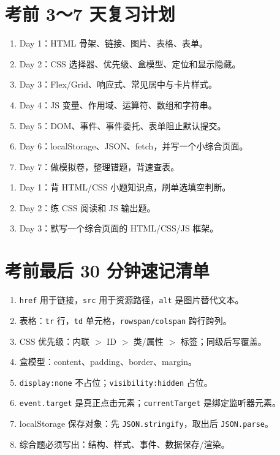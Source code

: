 \documentclass[UTF8,zihao=-4]{ctexart}
\begin{document}
\section{考前 3～7 天复习计划}
\begin{methodbox}[7 天版]
\begin{enumerate}
  \item Day 1：HTML 骨架、链接、图片、表格、表单。
  \item Day 2：CSS 选择器、优先级、盒模型、定位和显示隐藏。
  \item Day 3：Flex/Grid、响应式、常见居中与卡片样式。
  \item Day 4：JS 变量、作用域、运算符、数组和字符串。
  \item Day 5：DOM、事件、事件委托、表单阻止默认提交。
  \item Day 6：localStorage、JSON、fetch，并写一个小综合页面。
  \item Day 7：做模拟卷，整理错题，背速查表。
\end{enumerate}
\end{methodbox}

\begin{methodbox}[3 天版]
\begin{enumerate}
  \item Day 1：背 HTML/CSS 小题知识点，刷单选填空判断。
  \item Day 2：练 CSS 阅读和 JS 输出题。
  \item Day 3：默写一个综合页面的 HTML/CSS/JS 框架。
\end{enumerate}
\end{methodbox}

\section{考前最后 30 分钟速记清单}
\begin{keybox}[只看这些]
\begin{enumerate}
  \item \texttt{href} 用于链接，\texttt{src} 用于资源路径，\texttt{alt} 是图片替代文本。
  \item 表格：\texttt{tr} 行，\texttt{td} 单元格，\texttt{rowspan/colspan} 跨行跨列。
  \item CSS 优先级：内联 $>$ ID $>$ 类/属性 $>$ 标签；同级后写覆盖。
  \item 盒模型：content、padding、border、margin。
  \item \texttt{display:none} 不占位；\texttt{visibility:hidden} 占位。
  \item \texttt{event.target} 是真正点击元素；\texttt{currentTarget} 是绑定监听器元素。
  \item localStorage 保存对象：先 \texttt{JSON.stringify}，取出后 \texttt{JSON.parse}。
  \item 综合题必须写出：结构、样式、事件、数据保存/渲染。
\end{enumerate}
\end{keybox}
\end{document}
